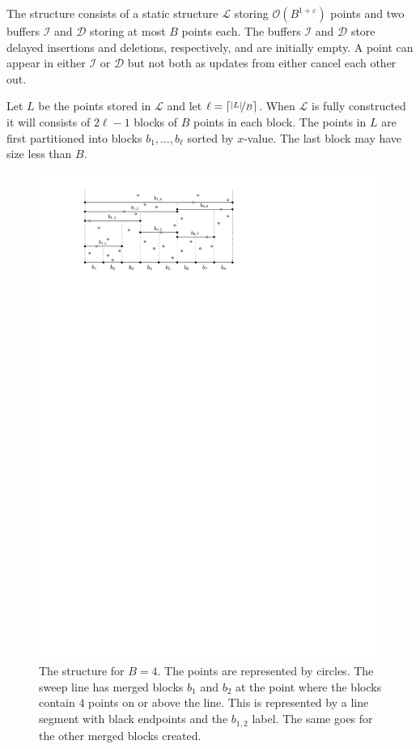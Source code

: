 \documentclass[twoside,11pt,openright]{report}
\def \epsilon {\varepsilon}
\begin{document}
The structure consists of a static structure $\mathcal{L}$ storing $\mathcal{O}(B^{1+\epsilon})$ points and two buffers $\mathcal{I}$ and $\mathcal{D}$ storing at most $B$ points each. The buffers $\mathcal{I}$ and $\mathcal{D}$ store delayed insertions and deletions, respectively, and are initially empty. A point can appear in either $\mathcal{I}$ or $\mathcal{D}$ but not both as updates from either cancel each other out.

Let $L$ be the points stored in $\mathcal{L}$ and let $\ell = \lceil \nicefrac{\vert L \vert}{B}\rceil$. When $\mathcal{L}$ is fully constructed it will consists of $2\ell-1$ blocks of $B$ points in each block. The points in $L$ are first partitioned into blocks $b_1,\dots,b_\ell$ sorted by $x$-value. The last block may have size less than $B$.

\begin{figure}[h]
	\centering
	\includegraphics[scale=1]{../figures/sweep-line}
	\caption{The structure for $B=4$. The points are represented by circles. The sweep line has merged blocks $b_1$ and $b_2$ at the point where the blocks contain $4$ points on or above the line. This is represented by a line segment with black endpoints and the $b_{1,2}$ label. The same goes for the other merged blocks created.}
	\label{fig:sweep-line}
\end{figure}
\end{document}
